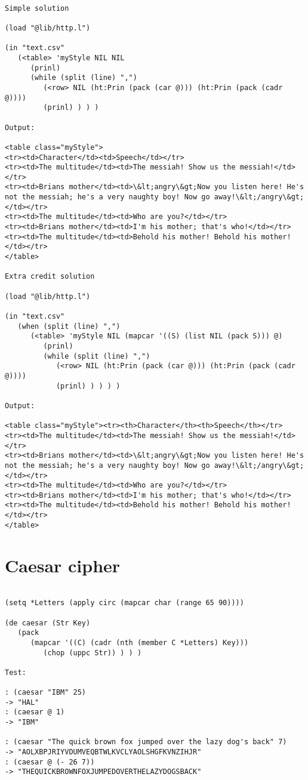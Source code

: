 \begin{verbatim}

Simple solution

(load "@lib/http.l")

(in "text.csv"
   (<table> 'myStyle NIL NIL
      (prinl)
      (while (split (line) ",")
         (<row> NIL (ht:Prin (pack (car @))) (ht:Prin (pack (cadr @))))
         (prinl) ) ) )

Output:

<table class="myStyle">
<tr><td>Character</td><td>Speech</td></tr>
<tr><td>The multitude</td><td>The messiah! Show us the messiah!</td></tr>
<tr><td>Brians mother</td><td>\&lt;angry\&gt;Now you listen here! He's not the messiah; he's a very naughty boy! Now go away!\&lt;/angry\&gt;</td></tr>
<tr><td>The multitude</td><td>Who are you?</td></tr>
<tr><td>Brians mother</td><td>I'm his mother; that's who!</td></tr>
<tr><td>The multitude</td><td>Behold his mother! Behold his mother!</td></tr>
</table>

Extra credit solution

(load "@lib/http.l")

(in "text.csv"
   (when (split (line) ",")
      (<table> 'myStyle NIL (mapcar '((S) (list NIL (pack S))) @)
         (prinl)
         (while (split (line) ",")
            (<row> NIL (ht:Prin (pack (car @))) (ht:Prin (pack (cadr @))))
            (prinl) ) ) ) )

Output:

<table class="myStyle"><tr><th>Character</th><th>Speech</th></tr>
<tr><td>The multitude</td><td>The messiah! Show us the messiah!</td></tr>
<tr><td>Brians mother</td><td>\&lt;angry\&gt;Now you listen here! He's not the messiah; he's a very naughty boy! Now go away!\&lt;/angry\&gt;</td></tr>
<tr><td>The multitude</td><td>Who are you?</td></tr>
<tr><td>Brians mother</td><td>I'm his mother; that's who!</td></tr>
<tr><td>The multitude</td><td>Behold his mother! Behold his mother!</td></tr>
</table>

\end{verbatim}

\section*{Caesar cipher}

\begin{verbatim}

(setq *Letters (apply circ (mapcar char (range 65 90))))

(de caesar (Str Key)
   (pack
      (mapcar '((C) (cadr (nth (member C *Letters) Key)))
         (chop (uppc Str)) ) ) )

Test:

: (caesar "IBM" 25)
-> "HAL"
: (caesar @ 1)
-> "IBM"

: (caesar "The quick brown fox jumped over the lazy dog's back" 7)
-> "AOLXBPJRIYVDUMVEQBTWLKVCLYAOLSHGFKVNZIHJR"
: (caesar @ (- 26 7))
-> "THEQUICKBROWNFOXJUMPEDOVERTHELAZYDOGSBACK"

\end{verbatim}

